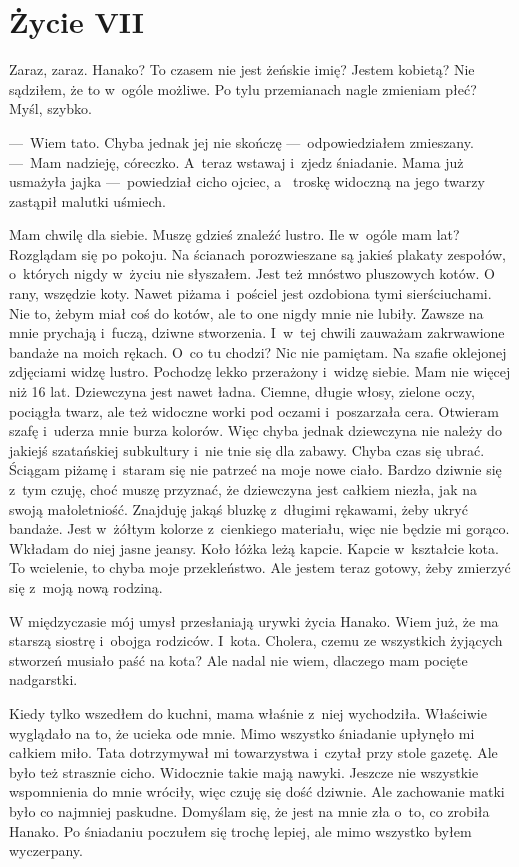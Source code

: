 \chapter{Życie VII}

Zaraz, zaraz. Hanako? To czasem nie jest żeńskie imię? Jestem kobietą? Nie sądziłem, że to w~ogóle możliwe. Po tylu 
przemianach nagle zmieniam płeć? Myśl, szybko.
 
---~Wiem tato. Chyba jednak jej nie skończę ---~odpowiedziałem zmieszany.
---~Mam nadzieję, córeczko. A~teraz wstawaj i~zjedz śniadanie. Mama już usmażyła jajka ---~powiedział cicho ojciec, a~
troskę widoczną na jego twarzy zastąpił malutki uśmiech.

Mam chwilę dla siebie. Muszę gdzieś znaleźć lustro. Ile w~ogóle mam lat? Rozglądam się po pokoju. Na ścianach 
porozwieszane są jakieś plakaty zespołów, o~których nigdy w~życiu nie słyszałem. Jest też mnóstwo pluszowych kotów. O~
rany, wszędzie koty. Nawet piżama i~pościel jest ozdobiona tymi sierściuchami. Nie to, żebym miał coś do kotów, ale 
to one nigdy mnie nie lubiły. Zawsze na mnie prychają i~fuczą, dziwne stworzenia. I~w~tej chwili zauważam zakrwawione 
bandaże na moich rękach. O~co tu chodzi? Nic nie pamiętam. Na szafie oklejonej zdjęciami widzę lustro. Pochodzę lekko 
przerażony i~widzę siebie. Mam nie więcej niż 16 lat. Dziewczyna jest nawet ładna. Ciemne, długie włosy, zielone 
oczy, pociągła twarz, ale też widoczne worki pod oczami i~poszarzała cera. Otwieram szafę i~uderza mnie burza 
kolorów. Więc chyba jednak dziewczyna nie należy do jakiejś szatańskiej subkultury i~nie tnie się dla zabawy. Chyba 
czas się ubrać. Ściągam piżamę i~staram się nie patrzeć na moje nowe ciało. Bardzo dziwnie się z~tym czuję, choć 
muszę przyznać, że dziewczyna jest całkiem niezła, jak na swoją małoletniość. Znajduję jakąś bluzkę z~długimi 
rękawami, żeby ukryć bandaże. Jest w~żółtym kolorze z~cienkiego materiału, więc nie będzie mi gorąco. Wkładam do niej 
jasne jeansy. Koło łóżka leżą kapcie. Kapcie w~kształcie kota. To wcielenie, to chyba moje przekleństwo. Ale jestem 
teraz gotowy, żeby zmierzyć się z~moją nową rodziną.

W międzyczasie mój umysł przesłaniają urywki życia Hanako. Wiem już, że ma starszą siostrę i~obojga rodziców. I~kota. 
Cholera, czemu ze wszystkich żyjących stworzeń musiało paść na kota? Ale nadal nie wiem, dlaczego mam pocięte 
nadgarstki.

Kiedy tylko wszedłem do kuchni, mama właśnie z~niej wychodziła. Właściwie wyglądało na to, że ucieka ode mnie. Mimo 
wszystko śniadanie upłynęło mi całkiem miło. Tata dotrzymywał mi towarzystwa i~czytał przy stole gazetę. Ale było też 
strasznie cicho. Widocznie takie mają nawyki. Jeszcze nie wszystkie wspomnienia do mnie wróciły, więc czuję się dość 
dziwnie. Ale zachowanie matki było co najmniej paskudne. Domyślam się, że jest na mnie zła o~to, co zrobiła Hanako. 
Po śniadaniu poczułem się trochę lepiej, ale mimo wszystko byłem wyczerpany.

